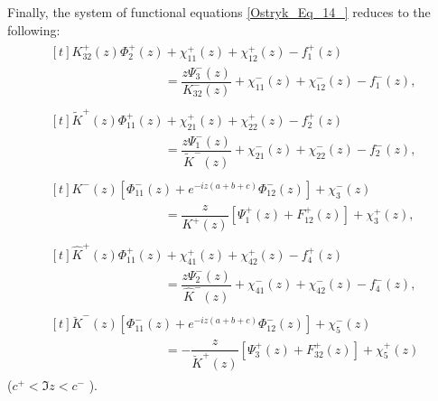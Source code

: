 Finally, the system of functional equations \eqref{Ostryk_Eq_14_} reduces to the following:
\begin{equation} \label{Ostryk_Eq_25_} 
\begin{array}{l}
	\begin{multlined}[t]
		K_{32}^{+} (z)\Phi _{2}^{+} (z)+\chi _{11}^{+} (z)+\chi _{12}^{+} (z)-f_{1}^{+} (z)
		\\[-1em]
		\hspace{9em}=\dfrac{z\Psi _{3}^{-} (z)}{K_{32}^{-} (z)} +\chi _{11}^{-} (z)+\chi _{12}^{-} (z)-f_{1}^{-} (z),
	\end{multlined}
	\\
	\begin{multlined}[t]
		\tilde{K}^{+} (z)\Phi _{11}^{+} (z)+\chi _{21}^{+} (z)+\chi _{22}^{+} (z)-f_{2}^{+} (z)
		\\[-1em]
		\hspace{9em}=\dfrac{z\Psi _{1}^{-} (z)}{\tilde{K}^{-} (z)} +\chi _{21}^{-} (z)+\chi _{22}^{-} (z)-f_{2}^{-} (z),
	\end{multlined}
	\\
	\begin{multlined}[t]
		K^{-} (z)\left[\Phi _{11}^{-} (z)+e^{-iz(a+b+c)} \Phi _{12}^{-} (z)\right]+\chi _{3}^{-} (z)
		\\[-1em]
		\hspace{9em}=\dfrac{z}{K^{+} (z)} \left[\Psi _{1}^{+} (z)+F_{12}^{+} (z)\right]+\chi _{3}^{+} (z),
	\end{multlined}
	\\
	\begin{multlined}[t]
		\hat{K}^{+} (z)\Phi _{11}^{+} (z)+\chi _{41}^{+} (z)+\chi _{42}^{+} (z)-f_{4}^{+} (z)
		\\[-1em]
		\hspace{9em}=\dfrac{z\Psi _{2}^{-} (z)}{\hat{K}^{-} (z)} +\chi _{41}^{-} (z)+\chi _{42}^{-} (z)-f_{4}^{-} (z),
	\end{multlined}	
	\\
	\begin{multlined}[t]
		\breve{K}^{-} (z)\left[\Phi _{11}^{-} (z)+e^{-iz(a+b+c)} \Phi _{12}^{-} (z)\right]+\chi _{5}^{-} (z)
		\\[-1em]
		\hspace{9em}=-\dfrac{z}{\breve{K}^{+} (z)} \left[\Psi _{3}^{+} (z)+F_{32}^{+} (z)\right]+\chi _{5}^{+} (z)
	\end{multlined}	
\end{array}
\end{equation} 
($c^{+} <\Im z<c^{-}$ ).  

